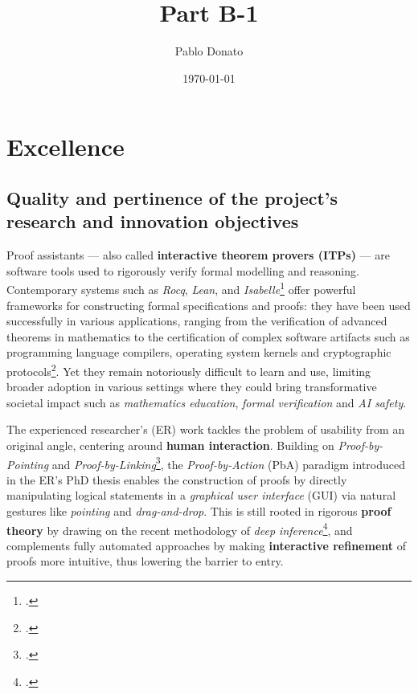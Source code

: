 \documentclass[11pt]{msca-pf}
\title{Part B-1}
\author{Pablo Donato}
\date{\today}
\begin{document}
\maketitle



\section{Excellence }
\label{sc:excellence}

\subsection{Quality and pertinence of the project's research and innovation objectives}
\label{ssc:excellence:quality}

Proof assistants --- also called \textbf{interactive theorem provers (ITPs)} --- are software tools
used to rigorously verify formal modelling and reasoning. Contemporary systems such as \emph{Rocq},
\emph{Lean}, and
\emph{Isabelle}\footcite{the_rocq_development_team_2025_15149629,10.1007/978-3-030-79876-5_37,nipkow2002isabelle}
offer powerful frameworks for constructing formal specifications and proofs: they have been used
successfully in various applications, ranging from the verification of advanced theorems in
mathematics to the certification of complex software artifacts such as programming language
compilers, operating system kernels and cryptographic
protocols\footcite{gonthierFormalProofFour2008,leroyFormalVerificationRealistic2009,kleinSeL4FormalVerification2009,Barthe2014}.
Yet they remain notoriously difficult to learn and use, limiting broader adoption in various
settings where they could bring transformative societal impact such as \emph{mathematics education},
\emph{formal verification} and \emph{AI safety}.

The experienced researcher's (ER) work tackles the problem of usability from an original angle,
centering around \textbf{human interaction}. Building on \emph{Proof-by-Pointing} and
\emph{Proof-by-Linking}\footcite{PbP,Chaudhuri2013}, the \emph{Proof-by-Action} (PbA) paradigm
introduced in the ER's PhD thesis enables the construction of proofs by directly manipulating
logical statements in a \emph{graphical user interface} (GUI) via natural gestures like
\emph{pointing} and \emph{drag-and-drop}. This is still rooted in rigorous \textbf{proof theory} by
drawing on the recent methodology of \emph{deep inference}\footcite{deep_inference}, and complements
fully automated approaches by making \textbf{interactive refinement} of proofs more intuitive, thus
lowering the barrier to entry.
\end{document}
